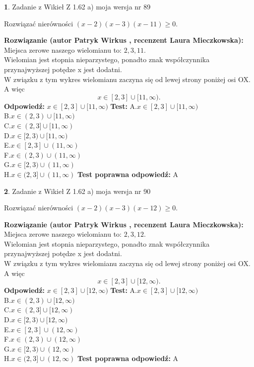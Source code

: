 \documentclass[12pt, a4paper]{article}
\theoremstyle{definition} %
\newtheorem{zad}{}
\newcommand{\zadStart}[1]{\begin{zad}#1\newline}
\newcommand{\zadStop}{\end{zad}}
\newcommand{\rozwStart}[2]{\noindent \textbf{Rozwiązanie (autor #1 , recenzent #2): }\newline}
\newcommand{\rozwStop}{\newline}
\newcommand{\odpStart}{\noindent \textbf{Odpowiedź:}\newline}
\newcommand{\odpStop}{\newline}
\newcommand{\testStart}{\noindent \textbf{Test:}\newline}
\newcommand{\testStop}{\newline}
\newcommand{\kluczStart}{\noindent \textbf{Test poprawna odpowiedź:}\newline}
\newcommand{\kluczStop}{\newline}
\begin{document}
\zadStart{Zadanie z Wikieł Z 1.62 a) moja wersja nr 89}

Rozwiązać nierówności $(x-2)(x-3)(x-11)\ge0$.
\zadStop
\rozwStart{Patryk Wirkus}{Laura Mieczkowska}
Miejsca zerowe naszego wielomianu to: $2, 3, 11$.\\
Wielomian jest stopnia nieparzystego, ponadto znak współczynnika przy\linebreak najwyższej potędze x jest dodatni.\\ W związku z tym wykres wielomianu zaczyna się od lewej strony poniżej osi OX. A więc $$x \in [2,3] \cup [11,\infty).$$
\rozwStop
\odpStart
$x \in [2,3] \cup [11,\infty)$
\odpStop
\testStart
A.$x \in [2,3] \cup [11,\infty)$\\
B.$x \in (2,3) \cup [11,\infty)$\\
C.$x \in (2,3] \cup [11,\infty)$\\
D.$x \in [2,3) \cup [11,\infty)$\\
E.$x \in [2,3] \cup (11,\infty)$\\
F.$x \in (2,3) \cup (11,\infty)$\\
G.$x \in [2,3) \cup (11,\infty)$\\
H.$x \in (2,3] \cup (11,\infty)$
\testStop
\kluczStart
A
\kluczStop



\zadStart{Zadanie z Wikieł Z 1.62 a) moja wersja nr 90}

Rozwiązać nierówności $(x-2)(x-3)(x-12)\ge0$.
\zadStop
\rozwStart{Patryk Wirkus}{Laura Mieczkowska}
Miejsca zerowe naszego wielomianu to: $2, 3, 12$.\\
Wielomian jest stopnia nieparzystego, ponadto znak współczynnika przy\linebreak najwyższej potędze x jest dodatni.\\ W związku z tym wykres wielomianu zaczyna się od lewej strony poniżej osi OX. A więc $$x \in [2,3] \cup [12,\infty).$$
\rozwStop
\odpStart
$x \in [2,3] \cup [12,\infty)$
\odpStop
\testStart
A.$x \in [2,3] \cup [12,\infty)$\\
B.$x \in (2,3) \cup [12,\infty)$\\
C.$x \in (2,3] \cup [12,\infty)$\\
D.$x \in [2,3) \cup [12,\infty)$\\
E.$x \in [2,3] \cup (12,\infty)$\\
F.$x \in (2,3) \cup (12,\infty)$\\
G.$x \in [2,3) \cup (12,\infty)$\\
H.$x \in (2,3] \cup (12,\infty)$
\testStop
\kluczStart
A
\kluczStop
\end{document}
